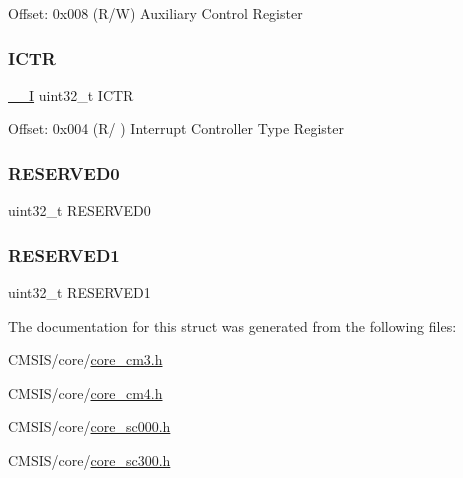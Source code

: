 Offset\+: 0x008 (R/W) Auxiliary Control Register \mbox{\label{struct_s_cn_s_c_b___type_a5bb2c6795b90f12077534825cc844b56}} 
\subsubsection{\texorpdfstring{ICTR}{ICTR}}
{\footnotesize\ttfamily \mbox{\hyperlink{core__sc300_8h_af63697ed9952cc71e1225efe205f6cd3}{\+\_\+\+\_\+I}} uint32\+\_\+t I\+C\+TR}

Offset\+: 0x004 (R/ ) Interrupt Controller Type Register \mbox{\label{struct_s_cn_s_c_b___type_a3bc109a372d05329e22cb7e3bf2b84ba}} 
\subsubsection{\texorpdfstring{RESERVED0}{RESERVED0}}
{\footnotesize\ttfamily uint32\+\_\+t R\+E\+S\+E\+R\+V\+E\+D0}

\mbox{\label{struct_s_cn_s_c_b___type_a9b85a62ba1c4cf0e4ca2b1ff8e5bc85c}} 
\subsubsection{\texorpdfstring{RESERVED1}{RESERVED1}}
{\footnotesize\ttfamily uint32\+\_\+t R\+E\+S\+E\+R\+V\+E\+D1}



The documentation for this struct was generated from the following files\+:\begin{DoxyCompactItemize}
\item 
C\+M\+S\+I\+S/core/\mbox{\hyperlink{core__cm3_8h}{core\+\_\+cm3.\+h}}\item 
C\+M\+S\+I\+S/core/\mbox{\hyperlink{core__cm4_8h}{core\+\_\+cm4.\+h}}\item 
C\+M\+S\+I\+S/core/\mbox{\hyperlink{core__sc000_8h}{core\+\_\+sc000.\+h}}\item 
C\+M\+S\+I\+S/core/\mbox{\hyperlink{core__sc300_8h}{core\+\_\+sc300.\+h}}\end{DoxyCompactItemize}
